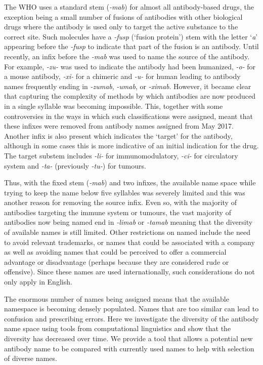 \documentclass{article}
\begin{document}
The WHO uses a standard stem (\emph{-mab}) for almost all
antibody-based drugs, the exception being a small number of fusions of
antibodies with other biological drugs where the antibody is used only
to target the active substance to the correct site. Such molecules
have a \emph{-fusp} (`fusion protein') stem with the letter `\emph{a}'
appearing before the \emph{-fusp} to indicate that part of the fusion
is an antibody. Until recently, an infix before the \emph{-mab} was
used to name the source of the antibody. For example, \emph{-zu-} was
used to indicate the antibody had been humanized, \emph{-o-} for a
mouse antibody, \emph{-xi-} for a chimeric and \emph{-u-} for
human\cite{xxx} leading to antibody names frequently ending in
\emph{-zumab}, \emph{-umab}, or \emph{-ximab}. However, it became
clear that capturing the complexity of methods by which antibodies are
now produced in a single syllable was becoming impossible. This,
together with some controversies in the ways in which such
classifications were assigned, meant that these infixes were removed
from antibody names assigned from May 2017\cite{xxx}. Another infix is
also present which indicates the `target' for the antibody, although in
some cases this is more indicative of an initial indication for the
drug. The target substem includes \emph{-li-} for immunomodulatory,
\emph{-ci-} for circulatory system and \emph{-ta-} (previously
\emph{-tu-}) for tumours.

Thus, with the fixed stem (\emph{-mab}) and two infixes, the available
name space while trying to keep the name below five syllables was
severely limited and this was another reason for removing the source
infix. Even so, with the majority of antibodies targeting the immune
system or tumours, the vast majority of antibodies now being named end
in \emph{-limab} or \emph{-tamab} meaning that the diversity of
available names is still limited. Other restrictions on named include
the need to avoid relevant trademarks, or names that could be
associated with a company as well as avoiding names that could be
perceived to offer a commercial advantage or disadvantage (perhaps
because they are considered rude or offensive). Since these names are
used internationally, such considerations do not only apply in
English.

The enormous number of names being assigned means that the available
namespace is becoming densely populated. Names that are too similar
can lead to confusion and prescribing errors. Here we investigate the
diversity of the antibody name space using tools from computational
linguistics and show that the diversity has decreased over time. We
provide a tool that allows a potential new antibody name to be
compared with currently used names to help with selection of diverse
names.
\end{document}
